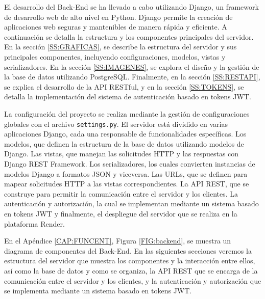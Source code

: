 El desarrollo del Back-End se ha llevado a cabo utilizando Django, un framework de desarrollo web de alto nivel en Python. Django permite la creación de aplicaciones web seguras y mantenibles de manera rápida y eficiente. A continuación se detalla la estructura y los componentes principales del servidor. En la sección \ref{SS:GRAFICAS}, se describe la estructura del servidor y sus principales componentes, incluyendo configuraciones, modelos, vistas y serializadores. En la sección \ref{SS:IMAGENES}, se explora el diseño y la gestión de la base de datos utilizando PostgreSQL. Finalmente, en la sección \ref{SS:RESTAPI}, se explica el desarrollo de la API RESTful, y en la sección \ref{SS:TOKENS}, se detalla la implementación del sistema de autenticación basado en tokens JWT.

La configuración del proyecto se realiza mediante la gestión de configuraciones globales con el archivo \texttt{settings.py}. El servidor está dividido en varias aplicaciones Django, cada una responsable de funcionalidades específicas. Los modelos, que definen la estructura de la base de datos utilizando modelos de Django. Las vistas, que manejan las solicitudes HTTP y las respuestas con Django REST Framework. Los serializadores, los cuales convierten instancias de modelos Django a formatos JSON y viceversa. Las URLs, que se definen para mapear solicitudes HTTP a las vistas correspondientes. La API REST, que se construye para permitir la comunicación entre el servidor y los clientes. La autenticación y autorización, la cual se implementan mediante un sistema basado en tokens JWT y finalmente, el despliegue del servidor que se realiza en la plataforma Render.

En el Apéndice \ref{CAP:FUNCENT}, Figura \ref{FIG:backend}, se muestra un diagrama de componentes del Back-End. En las siguientes secciones veremos la estructura del servidor que muestra los componentes y la interacción entre ellos, así como la base de datos y como se organiza, la API REST que se encarga de la comunicación entre el servidor y los clientes, y la autenticación y autorización que se implementa mediante un sistema basado en tokens JWT.
